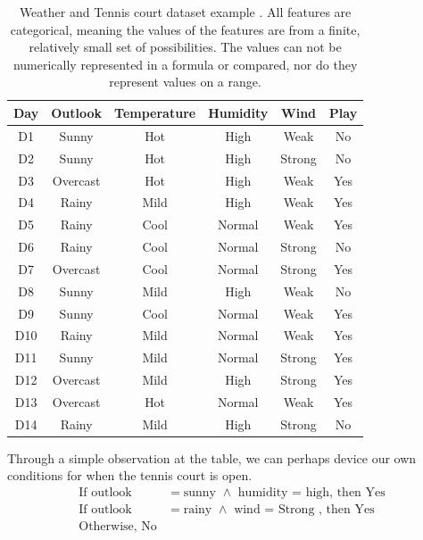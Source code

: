 \begin{table}
\begin{center}
     \begin{tabular}{||c c c c c c||} 
    \hline
     Day & Outlook & Temperature & Humidity & Wind & Play \\ [0.5ex] 
    \hline\hline
     D1 & Sunny & Hot & High & Weak  & No\\ 
    \hline
     D2 & Sunny & Hot & High & Strong  & No\\ 
    \hline
     D3 & Overcast & Hot & High & Weak  & Yes\\ 
    \hline
     D4 & Rainy & Mild & High & Weak  & Yes\\ 
    \hline
     D5 & Rainy & Cool & Normal & Weak  & Yes\\ 
    \hline
     D6 & Rainy & Cool & Normal & Strong  & No\\ 
    \hline
     D7 & Overcast & Cool & Normal & Strong  & Yes\\ 
    \hline
     D8 & Sunny & Mild & High & Weak  & No\\ 
    \hline
     D9 & Sunny & Cool & Normal & Weak  & Yes\\ 
    \hline
     D10 & Rainy & Mild & Normal & Weak  & Yes\\ 
    \hline
     D11 & Sunny & Mild & Normal & Strong  & Yes\\ 
    \hline
     D12 & Overcast & Mild & High & Strong  & Yes\\ 
    \hline
     D13 & Overcast & Hot & Normal & Weak  & Yes\\ 
    \hline
     D14 & Rainy & Mild & High & Strong & No\\  [1ex]
    \hline
  \end{tabular}
\end{center}
\caption{Weather and Tennis court dataset example \cite{mitchell1997machine}. All features are categorical, meaning the values of the features are from a finite, relatively small set of possibilities. The values can not be numerically represented in a formula or compared, nor do they represent values on a range.}
\label{table:categorial_examples_weather}
\end{table}

Through a simple observation at the table, we can perhaps device our own conditions for when the tennis court is open.
\begin{align*}
    \textrm{If outlook}&=\textrm{sunny } \wedge \textrm{ humidity = high, then Yes} \\
    \textrm{If outlook}&= \textrm{rainy } \wedge \textrm{ wind = Strong , then Yes} \\
    \textrm{Otherwise, No}
\end{align*}

